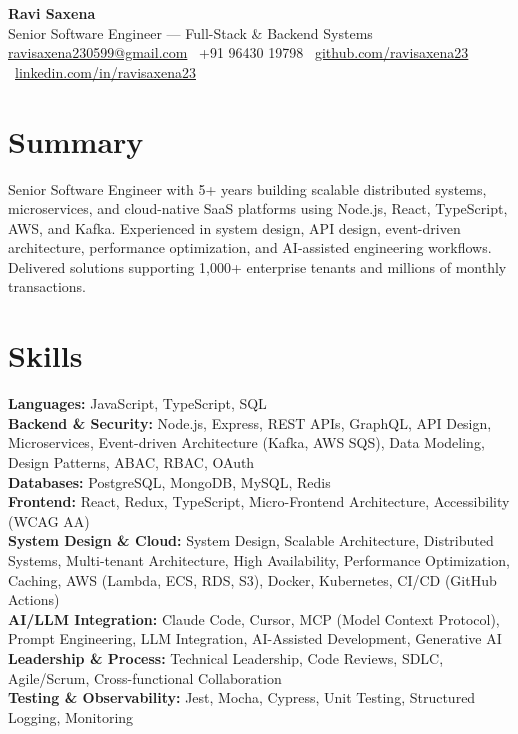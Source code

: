 \documentclass[a4paper,10.5pt]{article}
\begin{document}
\pagestyle{empty}

\begin{center}
    {\LARGE\bfseries Ravi Saxena} \\[2pt]
    Senior Software Engineer --- Full-Stack \& Backend Systems \\[2pt]
    \href{mailto:ravisaxena230599@gmail.com}{ravisaxena230599@gmail.com} \textbar\
    +91 96430 19798 \textbar\
    \href{https://github.com/ravisaxena23}{github.com/ravisaxena23} \textbar\
    \href{https://linkedin.com/in/ravisaxena23}{linkedin.com/in/ravisaxena23}
\end{center}
\vspace{-6pt}

\section{Summary}
Senior Software Engineer with 5+ years building scalable distributed systems, microservices, and cloud-native SaaS platforms using Node.js, React, TypeScript, AWS, and Kafka. Experienced in system design, API design, event-driven architecture, performance optimization, and AI-assisted engineering workflows. Delivered solutions supporting 1,000+ enterprise tenants and millions of monthly transactions.

\section{Skills}
\textbf{Languages:} JavaScript, TypeScript, SQL \\
\textbf{Backend \& Security:} Node.js, Express, REST APIs, GraphQL, API Design,
Microservices, Event-driven Architecture (Kafka, AWS SQS), Data Modeling, Design Patterns, ABAC, RBAC, OAuth \\
\textbf{Databases:} PostgreSQL, MongoDB, MySQL, Redis \\
\textbf{Frontend:} React, Redux, TypeScript, Micro-Frontend Architecture,
Accessibility (WCAG AA) \\
\textbf{System Design \& Cloud:} System Design, Scalable Architecture, Distributed Systems, Multi-tenant
Architecture, High Availability, Performance Optimization, Caching, AWS (Lambda, ECS, RDS, S3), Docker,
Kubernetes, CI/CD (GitHub Actions) \\
\textbf{AI/LLM Integration:} Claude Code, Cursor, MCP (Model Context
Protocol), Prompt Engineering, LLM Integration, AI-Assisted Development, Generative AI \\
\textbf{Leadership \& Process:} Technical Leadership, Code Reviews, SDLC, Agile/Scrum, Cross-functional Collaboration \\
\textbf{Testing \& Observability:} Jest, Mocha, Cypress, Unit Testing, Structured Logging, Monitoring
\end{document}
